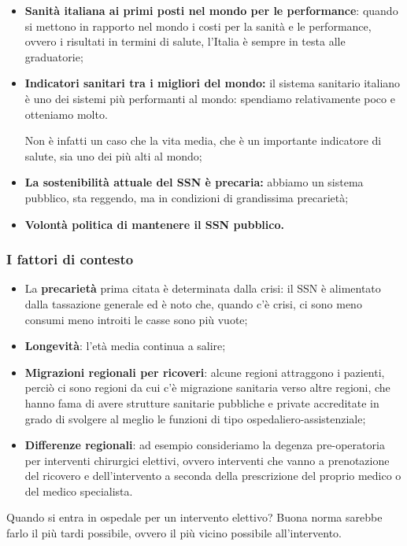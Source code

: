 \begin{itemize}
\item
  \textbf{Sanità italiana ai primi posti nel mondo per le performance}:
  quando si mettono in rapporto nel mondo i costi per la sanità e le
  performance, ovvero i risultati in termini di salute, l'Italia è
  sempre in testa alle graduatorie;
\item
  \textbf{Indicatori sanitari tra i migliori del mondo:} il sistema
  sanitario italiano è uno dei sistemi più performanti al mondo:
  spendiamo relativamente poco e otteniamo molto.

Non è infatti un caso che la vita media, che è un importante indicatore
di salute, sia uno dei più alti al mondo;

\item
  \textbf{La sostenibilità attuale del SSN è precaria:} abbiamo un
  sistema pubblico, sta reggendo, ma in condizioni di grandissima
  precarietà;
\item
  \textbf{Volontà politica di mantenere il SSN pubblico.}
\end{itemize}

\subsubsection{I fattori di contesto}

\begin{itemize}
\item
  La \textbf{precarietà} prima citata è determinata dalla crisi: il SSN
  è alimentato dalla tassazione generale ed è noto che, quando c'è
  crisi, ci sono meno consumi meno introiti le casse sono più vuote;
\item
  \textbf{Longevità}: l'età media continua a salire;
\item
  \textbf{Migrazioni regionali per ricoveri}: alcune regioni attraggono
  i pazienti, perciò ci sono regioni da cui c'è migrazione sanitaria
  verso altre regioni, che hanno fama di avere strutture sanitarie
  pubbliche e private accreditate in grado di svolgere al meglio le
  funzioni di tipo ospedaliero-assistenziale;
\item
  \textbf{Differenze regionali}: ad esempio consideriamo la degenza
  pre-operatoria per interventi chirurgici elettivi, ovvero interventi
  che vanno a prenotazione del ricovero e dell'intervento a seconda
  della prescrizione del proprio medico o del medico specialista.
\end{itemize}

Quando si entra in ospedale per un intervento elettivo? Buona norma
sarebbe farlo il più tardi possibile, ovvero il più vicino possibile
all'intervento.

